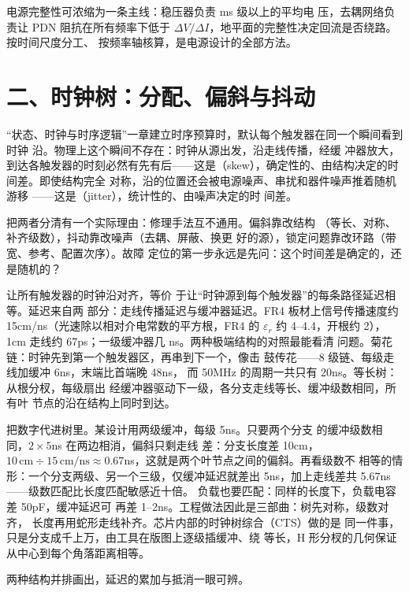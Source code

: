 \begin{keyidea}
电源完整性可浓缩为一条主线：稳压器负责 ms 级以上的平均电
压，去耦网络负责让 PDN 阻抗在所有频率下低于 $\Delta V /
\Delta I$，地平面的完整性决定回流是否绕路。按时间尺度分工、
按频率轴核算，是电源设计的全部方法。
\end{keyidea}

\section{二、时钟树：分配、偏斜与抖动}

“状态、时钟与时序逻辑”一章建立时序预算时，默认每个触发器在同一个瞬间看到时钟
沿。物理上这个瞬间不存在：时钟从源出发，沿走线传播，经缓
冲器放大，到达各触发器的时刻必然有先有后——这是（skew），确定性的、由结构决定的时间差。即使结构完全
对称，沿的位置还会被电源噪声、串扰和器件噪声推着随机游移
——这是（jitter），统计性的、由噪声决定的时
间差。

把两者分清有一个实际理由：修理手法互不通用。偏斜靠改结构
（等长、对称、补齐级数），抖动靠改噪声（去耦、屏蔽、换更
好的源），锁定问题靠改环路（带宽、参考、配置次序）。故障
定位的第一步永远是先问：这个时间差是确定的，还是随机的？

让所有触发器的时钟沿对齐，等价
于让“时钟源到每个触发器”的每条路径延迟相等。延迟来自两
部分：走线传播延迟与缓冲器延迟。FR4 板材上信号传播速度约
15cm/ns（光速除以相对介电常数的平方根，FR4 的 $\varepsilon_r$ 约 4--4.4，开根约 2），1cm
走线约 67ps；一级缓冲器几 ns。两种极端结构的对照最能看清
问题。菊花链：时钟先到第一个触发器区，再串到下一个，像击
鼓传花——8 级链、每级走线加缓冲 6ns，末端比首端晚 48ns，
而 50MHz 的周期一共只有 20ns。等长树：从根分杈，每级扇出
经缓冲器驱动下一级，各分支走线等长、缓冲级数相同，所有叶
节点的沿在结构上同时到达。

把数字代进树里。某设计用两级缓冲，每级 5ns。只要两个分支
的缓冲级数相同，$2 \times 5$ns 在两边相消，偏斜只剩走线
差：分支长度差 10cm，$10\,\mathrm{cm} \div 15\,\mathrm{cm/ns}
\approx 0.67$ns，这就是两个叶节点之间的偏斜。再看级数不
相等的情形：一个分支两级、另一个三级，仅缓冲延迟就差出
5ns，加上走线差共 5.67ns——级数匹配比长度匹配敏感近十倍。
负载也要匹配：同样的长度下，负载电容差 50pF，缓冲延迟可
再差 1--2ns。工程做法因此是三部曲：树先对称，级数对齐，
长度再用蛇形走线补齐。芯片内部的时钟树综合（CTS）做的是
同一件事，只是分支成千上万，由工具在版图上逐级插缓冲、绕
等长，H 形分杈的几何保证从中心到每个角落距离相等。

两种结构并排画出，延迟的累加与抵消一眼可辨。

